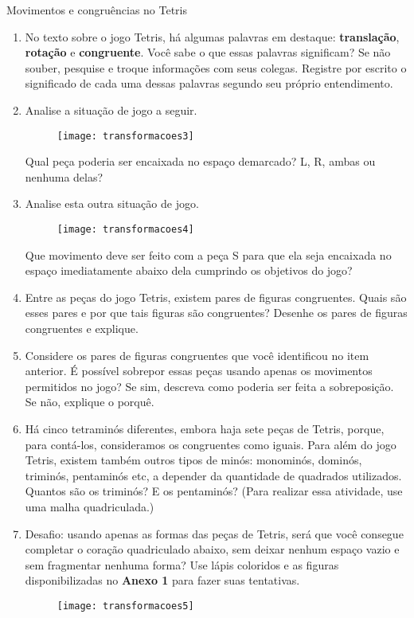 \begin{task}{Movimentos e congruências no Tetris}
\begin{enumerate}
\item No texto sobre o jogo Tetris, há algumas palavras em destaque: \textbf{translação}, \textbf{rotação} e \textbf{congruente}. Você sabe o que essas palavras significam? Se não souber, pesquise e troque informações com seus colegas. Registre por escrito o significado de cada uma dessas palavras segundo seu próprio entendimento.
\item Analise a situação de jogo a seguir.
\begin{figure}[H]
\centering

\texttt{[image: transformacoes3]}
\end{figure}

Qual peça poderia ser encaixada no espaço demarcado? L, R, ambas ou nenhuma delas?
\item Analise esta outra situação de jogo.
\begin{figure}[H]
\centering

\texttt{[image: transformacoes4]}
\end{figure}

Que movimento deve ser feito com a peça S para que ela seja encaixada no espaço imediatamente abaixo dela cumprindo os objetivos do jogo?

\item Entre as peças do jogo Tetris, existem pares de figuras congruentes. Quais são esses pares e por que tais figuras são congruentes? Desenhe os pares de figuras congruentes e explique.

\item Considere os pares de figuras congruentes que você identificou no item anterior. É possível sobrepor essas peças usando apenas os movimentos permitidos no jogo? Se sim, descreva como poderia ser feita a sobreposição. Se não, explique o porquê.

\item Há cinco tetraminós diferentes, embora haja sete peças de Tetris, porque, para contá-los, consideramos os congruentes como iguais. Para além do jogo Tetris, existem também outros tipos de minós: monominós, dominós, triminós, pentaminós etc, a depender da quantidade de quadrados utilizados. Quantos são os triminós? E os pentaminós? (Para realizar essa atividade, use uma malha quadriculada.)

\item Desafio: usando apenas as formas das peças de Tetris, será que você consegue completar o coração quadriculado abaixo, sem deixar nenhum espaço vazio e sem fragmentar nenhuma forma? Use lápis coloridos e as figuras disponibilizadas no \textbf{Anexo 1} para fazer suas tentativas.

\begin{figure}[H]
\centering

\texttt{[image: transformacoes5]}
\end{figure}
\end{enumerate}
\end{task}

